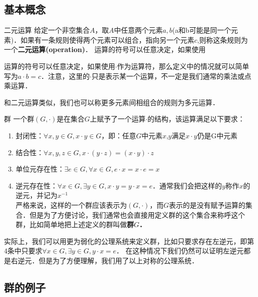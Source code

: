 
\subsection{基本概念}

\begin{definition}{二元运算}
给定一个非空集合$A$，取$A$中任意两个元素$a, b$(a和b可能是同一个元素)．如果有一条规则使得两个元素可以组合，指向另一个元素$c$,则称这条规则为一个\textbf{二元运算(operation)}． 运算的符号可以任意决定，如果使用
\end{definition}

运算的符号可以任意决定，如果使用$\cdot$作为运算符，那么定义中的情况就可以简单写为$a· b=c$．注意，这里的$\cdot$只是表示某一个运算，不一定是我们通常的乘法或点乘运算．

和二元运算类似，我们也可以称更多元素间相组合的规则为多元运算．

\begin{definition}{群}
一个群$(G, \cdot)$是在集合$G$上赋予了一个运算$\cdot$的结构，该运算满足以下要求：\\

\begin{enumerate}
\item 封闭性：$∀x, y∈ G, x· y∈ G$，即：任意$G$中元素$x$,$y$满足$x· y$仍是G中元素
\item 结合性：$∀ x, y, z\in G, x·(y· z)=(x· y)· z$
\item 单位元存在性：$∃ e\in G, ∀ x∈ G, e· x=x· e=x$
\item 逆元存在性：$∀ x∈ G, ∃ y∈ G, x· y=y· x=e$．通常我们会把这样的$y$称作$x$的逆元，并记为$x^{-1}$\\

严格来说，这样的一个群应该表示为$(G,\cdot)$，而$G$表示的是没有赋予运算的集合．但是为了方便讨论，我们通常也会直接用定义群的这个集合来称呼这个群，比如简单地把上述定义的群叫做\textbf{群$G$．}
\end{enumerate}
\end{definition}

实际上，我们可以用更为弱化的公理系统来定义群，比如只要求存在左逆元，即第4条中只要求$∀ x∈ G, ∃ y∈ G, y· x=e$． 在这种情况下我们仍然可以证明左逆元都是右逆元．但是为了方便理解，我们用了以上对称的公理系统．

\subsection{群的例子}


